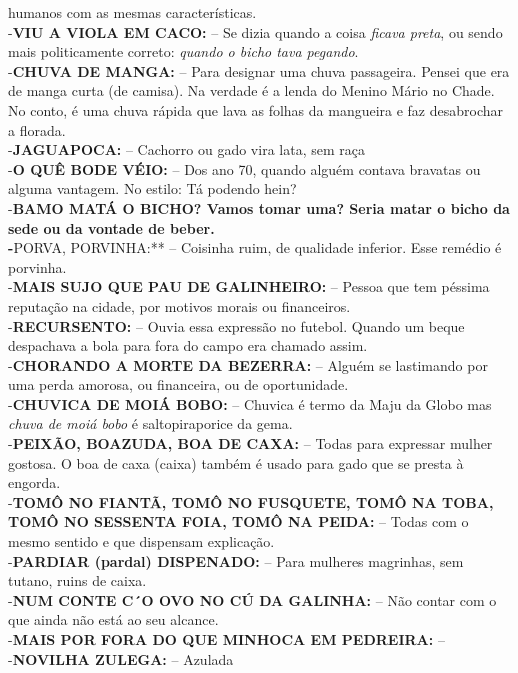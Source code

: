 \documentclass[12pt,brazil,]{book}
\begin{document}
\begin{itemize}
  humanos com as mesmas características.\\
  -\textbf{VIU A VIOLA EM CACO:} -- Se dizia quando a coisa \emph{ficava
  preta}, ou sendo mais politicamente correto: \emph{quando o bicho tava
  pegando}.\\
  -\textbf{CHUVA DE MANGA:} -- Para designar uma chuva passageira.
  Pensei que era de manga curta (de camisa). Na verdade é a lenda do
  Menino Mário no Chade. No conto, é uma chuva rápida que lava as folhas
  da mangueira e faz desabrochar a florada.\\
  -\textbf{JAGUAPOCA:} -- Cachorro ou gado vira lata, sem raça\\
  -\textbf{O QUÊ BODE VÉIO:} -- Dos ano 70, quando alguém contava
  bravatas ou alguma vantagem. No estilo: Tá podendo hein?\\
  -\textbf{BAMO MATÁ O BICHO? Vamos tomar uma? Seria matar o bicho da
  sede ou da vontade de beber.\\
  -}PORVA, PORVINHA:** -- Coisinha ruim, de qualidade inferior. Esse
  remédio é porvinha.\\
  -\textbf{MAIS SUJO QUE PAU DE GALINHEIRO:} -- Pessoa que tem péssima
  reputação na cidade, por motivos morais ou financeiros.\\
  -\textbf{RECURSENTO:} -- Ouvia essa expressão no futebol. Quando um
  beque despachava a bola para fora do campo era chamado assim.\\
  -\textbf{CHORANDO A MORTE DA BEZERRA:} -- Alguém se lastimando por uma
  perda amorosa, ou financeira, ou de oportunidade.\\
  -\textbf{CHUVICA DE MOIÁ BOBO:} -- Chuvica é termo da Maju da Globo
  mas \emph{chuva de moiá bobo} é saltopiraporice da gema.\\
  -\textbf{PEIXÃO, BOAZUDA, BOA DE CAXA:} -- Todas para expressar mulher
  gostosa. O boa de caxa (caixa) também é usado para gado que se presta
  à engorda.\\
  -\textbf{TOMÔ NO FIANTÃ, TOMÔ NO FUSQUETE, TOMÔ NA TOBA, TOMÔ NO
  SESSENTA FOIA, TOMÔ NA PEIDA:} -- Todas com o mesmo sentido e que
  dispensam explicação.\\
  -\textbf{PARDIAR (pardal) DISPENADO:} -- Para mulheres magrinhas, sem
  tutano, ruins de caixa.\\
  -\textbf{NUM CONTE C´O OVO NO CÚ DA GALINHA:} -- Não contar com o que
  ainda não está ao seu alcance.\\
  -\textbf{MAIS POR FORA DO QUE MINHOCA EM PEDREIRA:} --\\
  -\textbf{NOVILHA ZULEGA:} -- Azulada\\

\end{itemize}
\end{document}
